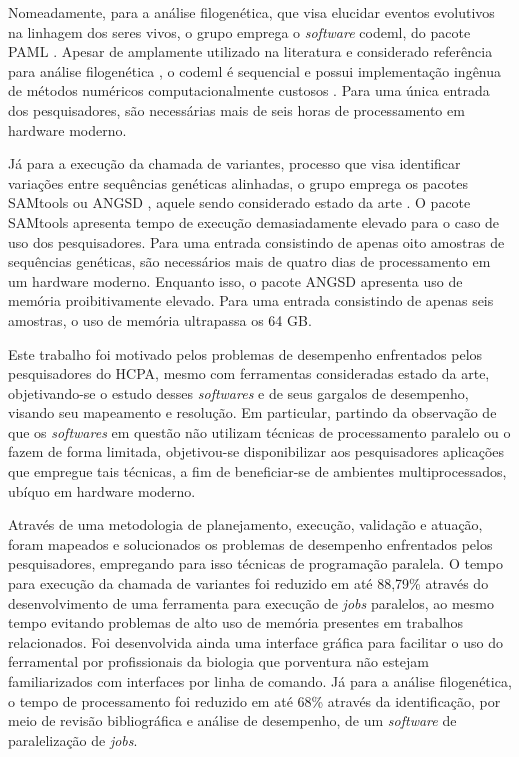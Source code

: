\documentclass[cic,tc]{iiufrgs}
\begin{document}
Nomeadamente, para a análise filogenética, que visa elucidar eventos evolutivos
na linhagem dos seres vivos, o grupo emprega o \textit{software} codeml, do pacote
PAML \cite{yang2007paml}. Apesar de amplamente utilizado na literatura e
considerado referência para análise filogenética \cite{maldonado2016lmap}, o
codeml é sequencial e possui implementação ingênua de métodos numéricos
computacionalmente custosos \cite{yang2020paml}. Para uma única entrada dos
pesquisadores, são necessárias mais de seis horas de processamento em hardware
moderno.

Já para a execução da chamada de variantes, processo que visa identificar
variações entre sequências genéticas alinhadas, o grupo emprega os pacotes
SAMtools \cite{li2009sequence} ou ANGSD \cite{korneliussen2014angsd}, aquele
sendo considerado estado da
arte \cite{poplin2018universal} \cite{yao2020evaluation}. O pacote SAMtools
apresenta tempo de execução demasiadamente elevado para o caso de uso dos
pesquisadores. Para uma entrada consistindo de apenas oito amostras de
sequências genéticas, são necessários mais de quatro dias de processamento em
um hardware moderno. Enquanto isso, o pacote ANGSD apresenta uso de memória
proibitivamente elevado. Para uma entrada consistindo de apenas seis amostras,
o uso de memória ultrapassa os 64 GB.

%
%
Este trabalho foi motivado pelos problemas de desempenho enfrentados pelos
pesquisadores do HCPA, mesmo com ferramentas consideradas estado da arte,
objetivando-se o estudo desses \textit{softwares} e de seus gargalos de
desempenho, visando seu mapeamento e resolução. Em particular, partindo da
observação de que os \textit{softwares} em questão não utilizam técnicas de
processamento paralelo ou o fazem de forma limitada, objetivou-se
disponibilizar aos pesquisadores aplicações que empregue tais técnicas, a fim
de beneficiar-se de ambientes multiprocessados, ubíquo em hardware moderno.

%
%
Através de uma metodologia de planejamento, execução, validação e atuação,
foram mapeados e solucionados os problemas de desempenho enfrentados pelos
pesquisadores, empregando para isso técnicas de programação paralela. O tempo
para execução da chamada de variantes foi reduzido em até 88,79\% através do
desenvolvimento de uma ferramenta para execução de \textit{jobs} paralelos, ao
mesmo tempo evitando problemas de alto uso de memória presentes em trabalhos
relacionados. Foi desenvolvida ainda uma interface gráfica para facilitar o uso
do ferramental por profissionais da biologia que porventura não estejam
familiarizados com interfaces por linha de comando. Já para a análise
filogenética, o tempo de processamento foi reduzido em até 68\% através da
identificação, por meio de revisão bibliográfica e análise de desempenho, de um
\textit{software} de paralelização de \textit{jobs}.
\end{document}
